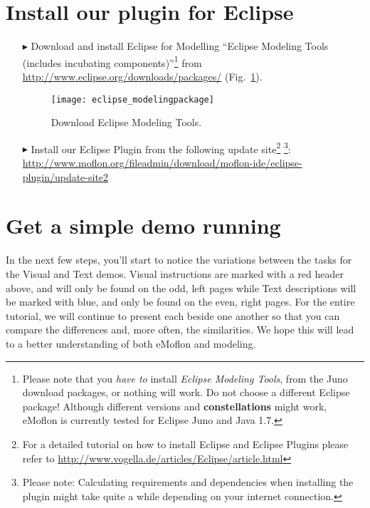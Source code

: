 \section{Install our plugin for Eclipse}
\label{stepTwo}
\begin{enumerate}
\item[$\blacktriangleright$] Download and install Eclipse for Modelling ``Eclipse Modeling Tools (includes incubating components)''\footnote{Please note that you \emph{have to} install \emph{Eclipse Modeling Tools}, from the Juno download packages, or nothing will work.  Do not choose a different Eclipse package!  Although different versions and {\bf constellations} might work, eMoflon is currently tested for Eclipse Juno and Java 1.7.} from \url{http://www.eclipse.org/downloads/packages/} (Fig.~\ref{fig_downloadModelingPackage}).

\begin{figure}[htbp]
	\centering
  	\texttt{[image: eclipse\_modelingpackage]}
	\caption{Download Eclipse Modeling Tools.}
	\label{fig_downloadModelingPackage}
\end{figure}

\item[$\blacktriangleright$] Install our Eclipse Plugin from the following update site\footnote{For a detailed tutorial on how to install Eclipse and Eclipse Plugins please refer to \url{http://www.vogella.de/articles/Eclipse/article.html}} 
\footnote{Please note: Calculating requirements and dependencies when installing the plugin might take quite a while depending on your internet connection.}:
\url{http://www.moflon.org/fileadmin/download/moflon-ide/eclipse-plugin/update-site2}

\end{enumerate}

\section{Get a simple demo running} %
\label{stepThree}

In the next few steps, you'll start to notice the variations between the tasks for the Visual and Text demos.
Visual instructions are marked with a red header above, and will only be found on the odd, left pages while Text descriptions will be marked with blue, and
only be found on the even, right pages.
For the entire tutorial, we will continue to present each beside one another so that you can compare the 
differences and, more often, the similarities. We hope this will lead to a better understanding of both eMoflon and modeling.

